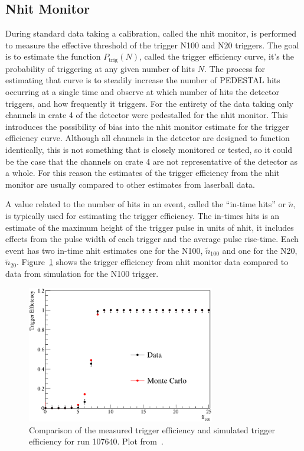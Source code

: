 \subsection{Nhit Monitor}
\label{sec:nhit_monitor}
During standard data taking a calibration, called the nhit monitor, is
performed to measure the effective threshold of the trigger N100 and N20
triggers.
The goal is to estimate the function $P_{\mathrm{trig}}(N)$,
called the trigger efficiency curve,
it's the probability of triggering at any given number of hits $N$.
The process for estimating that curve is to steadily increase the number of
PEDESTAL hits occurring at a single time and observe at which number of hits
the detector triggers, and how frequently it triggers.
For the entirety of the data taking only channels in
crate 4 of the detector were pedestalled for the nhit monitor.
This introduces the possibility of bias into the nhit monitor estimate
for the trigger efficiency curve.
Although all channels in the detector are designed to function identically, this
is not something that is closely monitored or tested, so it could be the case
that the channels on crate 4 are not representative of the detector as a whole.
For this reason the estimates of the trigger efficiency from the nhit monitor
are usually compared to other estimates from laserball data.

A value related to the number of hits in an event, called the ``in-time hits'' or
$\tilde{n}$,
is typically used for estimating the trigger efficiency.
The in-times hits is an estimate of the maximum height of the trigger pulse in
units of nhit, it includes effects from the pulse width of each trigger
and the average pulse rise-time.
Each event has two in-time nhit estimates one for the N100, $\tilde{n}_{100}$
and one for the N20, $\tilde{n}_{20}$.
Figure~\ref{fig:trigeff} shows the trigger efficiency from nhit monitor data
compared to data from simulation for the N100 trigger.
\begin{figure}[htbp]
    \centering
    \includegraphics[width=0.73\textwidth]{trigger_efficiecy}
    \caption[Trigger Efficiency] {Comparison of the measured trigger efficiency
    and simulated trigger efficiency for run 107640. Plot from~\citep{tanner_triggeff}.}
\label{fig:trigeff}
\end{figure}

